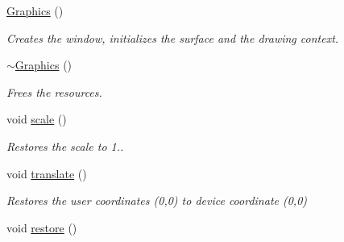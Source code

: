 \begin{DoxyCompactItemize}
\item 
\hyperlink{structslb_1_1core_1_1ui_1_1Graphics_affbe27c97d1598cda401b993b22cf214}{Graphics} ()\hypertarget{structslb_1_1core_1_1ui_1_1Graphics_affbe27c97d1598cda401b993b22cf214}{}\label{structslb_1_1core_1_1ui_1_1Graphics_affbe27c97d1598cda401b993b22cf214}

\begin{DoxyCompactList}\small\item\em Creates the window, initializes the surface and the drawing context. \end{DoxyCompactList}\item 
\hyperlink{structslb_1_1core_1_1ui_1_1Graphics_aa571f74e8c3f74506db24e4f6eb04135}{$\sim$\+Graphics} ()\hypertarget{structslb_1_1core_1_1ui_1_1Graphics_aa571f74e8c3f74506db24e4f6eb04135}{}\label{structslb_1_1core_1_1ui_1_1Graphics_aa571f74e8c3f74506db24e4f6eb04135}

\begin{DoxyCompactList}\small\item\em Frees the resources. \end{DoxyCompactList}\item 
void \hyperlink{structslb_1_1core_1_1ui_1_1Graphics_ac04ff16245079a00c7832a77e7332e82}{scale} ()\hypertarget{structslb_1_1core_1_1ui_1_1Graphics_ac04ff16245079a00c7832a77e7332e82}{}\label{structslb_1_1core_1_1ui_1_1Graphics_ac04ff16245079a00c7832a77e7332e82}

\begin{DoxyCompactList}\small\item\em Restores the scale to 1.. \end{DoxyCompactList}\item 
void \hyperlink{structslb_1_1core_1_1ui_1_1Graphics_a71571b540232fcec048f4636e2743f05}{translate} ()\hypertarget{structslb_1_1core_1_1ui_1_1Graphics_a71571b540232fcec048f4636e2743f05}{}\label{structslb_1_1core_1_1ui_1_1Graphics_a71571b540232fcec048f4636e2743f05}

\begin{DoxyCompactList}\small\item\em Restores the user coordinates (0,0) to device coordinate (0,0) \end{DoxyCompactList}\item 
void \hyperlink{structslb_1_1core_1_1ui_1_1Graphics_aa45a87f7bfd22656864992c5f8f7b63d}{restore} ()\hypertarget{structslb_1_1core_1_1ui_1_1Graphics_aa45a87f7bfd22656864992c5f8f7b63d}{}\label{structslb_1_1core_1_1ui_1_1Graphics_aa45a87f7bfd22656864992c5f8f7b63d}


\end{DoxyCompactItemize}
